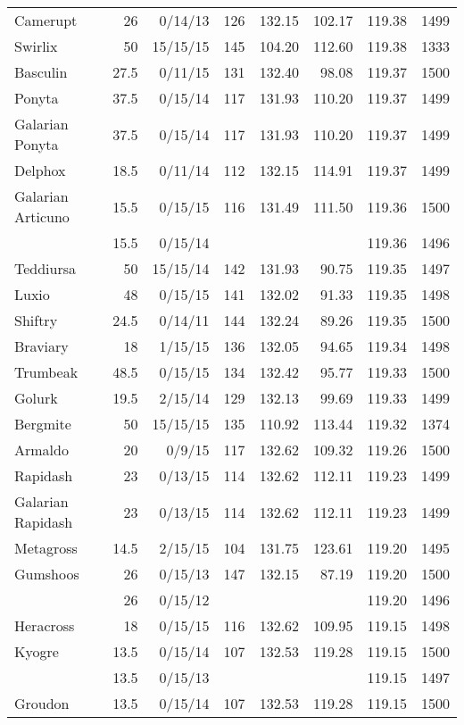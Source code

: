 \begin{longtable}{lrrrrrrr}
Camerupt & 26 & 0/14/13 & 126 & 132.15 & 102.17 & 119.38 & 1499\\
Swirlix & 50 & 15/15/15 & 145 & 104.20 & 112.60 & 119.38 & 1333\\
Basculin & 27.5 & 0/11/15 & 131 & 132.40 & 98.08 & 119.37 & 1500\\
Ponyta & 37.5 & 0/15/14 & 117 & 131.93 & 110.20 & 119.37 & 1499\\
Galarian Ponyta & 37.5 & 0/15/14 & 117 & 131.93 & 110.20 & 119.37 & 1499\\
Delphox & 18.5 & 0/11/14 & 112 & 132.15 & 114.91 & 119.37 & 1499\\
Galarian Articuno & 15.5 & 0/15/15 & 116 & 131.49 & 111.50 & 119.36 & 1500\\
 & 15.5 & 0/15/14 & & & & 119.36 & 1496\\
Teddiursa & 50 & 15/15/14 & 142 & 131.93 & 90.75 & 119.35 & 1497\\
Luxio & 48 & 0/15/15 & 141 & 132.02 & 91.33 & 119.35 & 1498\\
Shiftry & 24.5 & 0/14/11 & 144 & 132.24 & 89.26 & 119.35 & 1500\\
Braviary & 18 & 1/15/15 & 136 & 132.05 & 94.65 & 119.34 & 1498\\
Trumbeak & 48.5 & 0/15/15 & 134 & 132.42 & 95.77 & 119.33 & 1500\\
Golurk & 19.5 & 2/15/14 & 129 & 132.13 & 99.69 & 119.33 & 1499\\
Bergmite & 50 & 15/15/15 & 135 & 110.92 & 113.44 & 119.32 & 1374\\
Armaldo & 20 & 0/9/15 & 117 & 132.62 & 109.32 & 119.26 & 1500\\
Rapidash & 23 & 0/13/15 & 114 & 132.62 & 112.11 & 119.23 & 1499\\
Galarian Rapidash & 23 & 0/13/15 & 114 & 132.62 & 112.11 & 119.23 & 1499\\
Metagross & 14.5 & 2/15/15 & 104 & 131.75 & 123.61 & 119.20 & 1495\\
Gumshoos & 26 & 0/15/13 & 147 & 132.15 & 87.19 & 119.20 & 1500\\
 & 26 & 0/15/12 & & & & 119.20 & 1496\\
Heracross & 18 & 0/15/15 & 116 & 132.62 & 109.95 & 119.15 & 1498\\
Kyogre & 13.5 & 0/15/14 & 107 & 132.53 & 119.28 & 119.15 & 1500\\
 & 13.5 & 0/15/13 & & & & 119.15 & 1497\\
Groudon & 13.5 & 0/15/14 & 107 & 132.53 & 119.28 & 119.15 & 1500\\

\end{longtable}
